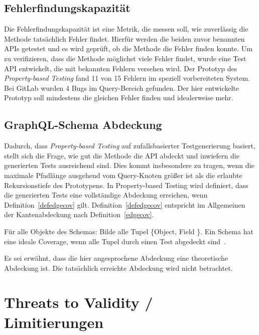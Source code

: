 \subsection{Fehlerfindungskapazität}

Die Fehlerfindungskapazität ist eine Metrik, die messen soll, wie zuverlässig die Methode tatsächlich Fehler findet.
Hierfür werden die beiden zuvor benannten APIs getestet und es wird geprüft, ob die Methode die Fehler finden konnte.
Um zu verifizieren, dass die Methode möglichst viele Fehler findet, wurde eine Test API entwickelt, die mit bekannten Fehlern versehen wird.
Der Prototyp des \textit{Property-based Testing} fand 11 von 15 Fehlern im speziell vorbereiteten System.
Bei GitLab wurden 4 Bugs im Query-Bereich gefunden.
Der hier entwickelte Prototyp soll mindestens die gleichen Fehler finden und idealerweise mehr.

\subsection{GraphQL-Schema Abdeckung}
\label{propiskant}

Dadurch, dass \textit{Property-based Testing} auf zufallsbasierter Testgenerierung basiert, stellt sich die Frage, wie gut die Methode
die API abdeckt und inwiefern die generierten Tests ausreichend sind.
Dies kommt insbesondere zu tragen, wenn die maximale Pfadlänge ausgehend vom Query-Knoten größer ist als die erlaubte Rekursionstiefe des Prototypens.
In Property-based Testing wird definiert, dass die generierten Tests eine vollständige Abdeckung erreichen, wenn Definition~\ref{defedgecov} gilt.
Definition~\ref{defedgecov} entspricht im Allgemeinen der Kantenabdeckung nach Definition~\ref{edgecov}.

\begin{definition}
    Für alle Objekte des Schemas: Bilde alle Tupel \{Object, Field \}.
    Ein Schema hat eine ideale Coverage, wenn alle Tupel durch einen Test abgedeckt sind~\cite[vgl. B. Measuring Schema Coverage]{property-based-testing}.
    \label{defedgecov}
\end{definition}

Es sei erwähnt, dass die hier angesprochene Abdeckung eine theoretische Abdeckung ist.
Die tatsächlich erreichte Abdeckung wird nicht betrachtet.

\section{Threats to Validity / Limitierungen}

